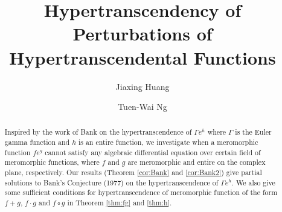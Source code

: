 \documentclass[reqno,12pt]{amsart}
\begin{document}



\title{Hypertranscendency of Perturbations of Hypertranscendental Functions}


\author{Jiaxing Huang}
\address{Department of Mathematics, The University of Hong Kong, 
Pokfulam Road, Hong Kong}


\author{Tuen-Wai Ng}
\address{Department of Mathematics, The University of Hong Kong, 
Pokfulam Road, Hong Kong}




\begin{abstract}
Inspired by the work of Bank on the hypertranscendence of $\Gamma e^h$ where $\Gamma$ is the Euler gamma function and $h$ is an entire function,
 we investigate when a meromorphic function $fe^g$ cannot satisfy any algebraic differential equation over certain field of meromorphic functions, 
 where $f$ and $g$ are meromorphic  and entire on the complex plane, respectively. Our results (Theorem \ref{cor:Bank} and \ref{cor:Bank2}) give  partial solutions to Bank's Conjecture (1977) on the hypertranscendence of $\Gamma e^h$. We also give some sufficient conditions for hypertranscendence of meromorphic function of the form $f+g$, $f\cdot g$ and $f\circ g$ in Theorem \ref{thm:fg} and \ref{thm:h}.

\end{abstract}
\end{document}
